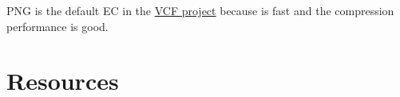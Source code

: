 PNG is the default EC in the
\href{https://github.com/Sistemas-Multimedia/VCF}{VCF project} because
is fast and the compression performance is good.

\section{Resources}

\renewcommand{\addcontentsline}[3]{}%

